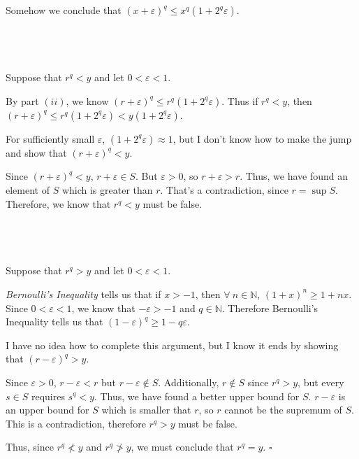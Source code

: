 \documentclass[a4paper]{article}
\begin{document}
Somehow we conclude that $(x + \varepsilon)^q \le x^q \left( 1 + 2^q \varepsilon \right)$.

\subsection{~}

Suppose that $r^q < y$ and let $0 < \varepsilon < 1$.

By part $(ii)$, we know $(r + \varepsilon)^q \le r^q (1 + 2^q \varepsilon)$. Thus if $r^q < y$, then $(r + \varepsilon)^q \le r^q (1 + 2^q \varepsilon) < y (1 + 2^q \varepsilon)$.

For sufficiently small $\varepsilon$, $(1 + 2^q \varepsilon) \approx 1$, but I don't know how to make the jump and show that $(r + \varepsilon)^q < y$.

Since $(r + \varepsilon)^q < y$, $r + \varepsilon \in S$. But $\varepsilon > 0$, so $r + \varepsilon > r$. Thus, we have found an element of $S$ which is greater than $r$. That's a contradiction, since $r = \sup S$. Therefore, we know that $r^q < y$ must be false.

\subsection{~}

Suppose that $r^q > y$ and let $0 < \varepsilon < 1$.

\textit{Bernoulli's Inequality} tells us that if $x > -1$, then $\forall\ n \in \mathbb N$, $(1 + x)^n \ge 1 + nx$. Since $0 < \varepsilon < 1$, we know that $-\varepsilon > -1$ and $q \in \mathbb N$. Therefore Bernoulli's Inequality tells us that $(1 - \varepsilon)^q \ge 1 - q\varepsilon$.

I have no idea how to complete this argument, but I know it ends by showing that $(r - \varepsilon)^q > y$.

Since $\varepsilon > 0$, $r - \varepsilon < r$ but $r - \varepsilon \notin S$. Additionally, $r \notin S$ since $r^q > y$, but every $s \in S$ requires $s^q < y$. Thus, we have found a better upper bound for $S$. $r - \varepsilon$ is an upper bound for $S$ which is smaller that $r$, so $r$ cannot be the supremum of $S$. This is a contradiction, therefore $r^q > y$ must be false.

Thus, since $r^q \not < y$ and $r^q \not > y$, we must conclude that $r^q = y$. \hfill $\square$
\end{document}
